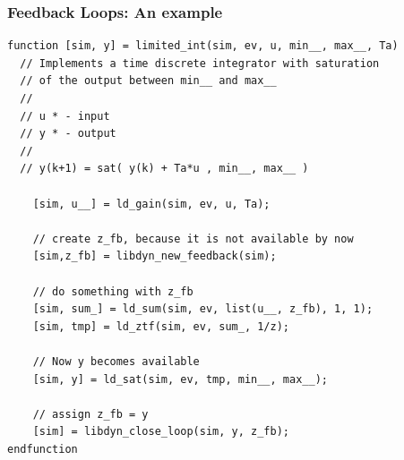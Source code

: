 \documentclass[serif,9pt,xcolor=dvipsnames]{beamer}
\begin{document}
\begin{frame}[fragile]
 \frametitle{Feedback Loops: An example}


  {\small 
  \begin{lstlisting} 
function [sim, y] = limited_int(sim, ev, u, min__, max__, Ta)
  // Implements a time discrete integrator with saturation
  // of the output between min__ and max__
  // 
  // u * - input
  // y * - output
  // 
  // y(k+1) = sat( y(k) + Ta*u , min__, max__ )

    [sim, u__] = ld_gain(sim, ev, u, Ta);
    
    // create z_fb, because it is not available by now
    [sim,z_fb] = libdyn_new_feedback(sim);
    
    // do something with z_fb
    [sim, sum_] = ld_sum(sim, ev, list(u__, z_fb), 1, 1);
    [sim, tmp] = ld_ztf(sim, ev, sum_, 1/z);

    // Now y becomes available
    [sim, y] = ld_sat(sim, ev, tmp, min__, max__); 

    // assign z_fb = y    
    [sim] = libdyn_close_loop(sim, y, z_fb);    
endfunction
\end{lstlisting}}


\end{frame}
\end{document}
